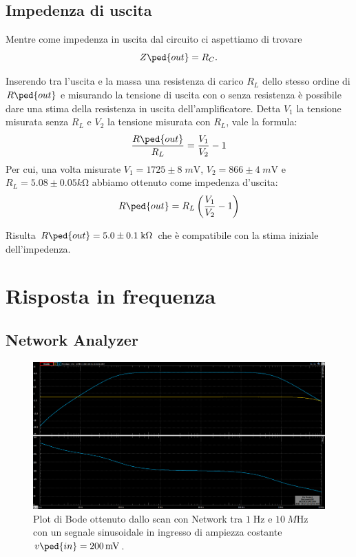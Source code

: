 \documentclass[10pt,a4paper]{article}
\begin{document}
\subsection{Impedenza di uscita}
Mentre come impedenza in uscita dal circuito ci aspettiamo di trovare
\[
Z\ped{out} = R_C
.\]

Inserendo tra l'uscita e la massa una resistenza di carico $R_L$ dello stesso
ordine di $R\ped{out}$ e misurando la tensione di uscita con o senza
resistenza è possibile dare una stima della resistenza in uscita
dell'amplificatore.
Detta $V_1$ la tensione misurata senza $R_L$ e $V_2$ la tensione misurata
con $R_L$, vale la formula:
\begin{equation}\label{eq: Zout}
\frac{R\ped{out}}{R_L} = \frac{V_1}{V_2} -1
\end{equation}
Per cui, una volta misurate $V_1 = 1725 \pm 8 \; \si{m\V}$,
$V_2 = 866 \pm 4\; \si{m\V}$ e $R_L = 5.08 \pm 0.05 \si{k\ohm}$ abbiamo ottenuto come impedenza d'uscita:
\[
R\ped{out} = R_L \left(\frac{V_1}{V_2} - 1\right)
\]

Risulta $R\ped{out} = 5.0 \pm 0.1\; \si{k\ohm}$ che è compatibile con la stima iniziale dell'impedenza.
\section{Risposta in frequenza}

\subsection{Network Analyzer}
\begin{figure}[htb]
\centering
\includegraphics[scale=0.35]{1-10Mnet}
\caption{Plot di Bode ottenuto dallo scan con Network tra $1 \; \si{\Hz}$ e
$\SI{10}{M\Hz}$ con un segnale sinusoidale in ingresso di ampiezza costante
$v\ped{in} = \SI{200}{m\V}$. \label{fig: bodeplot}}
\end{figure}
\end{document}
